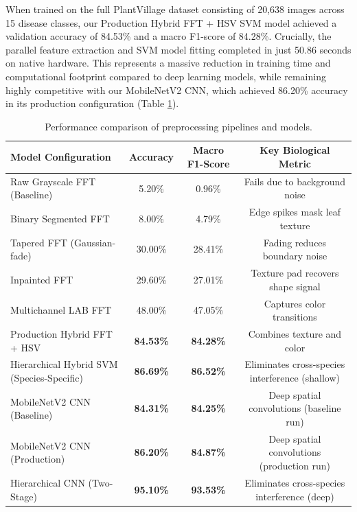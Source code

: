 \documentclass[11pt,a4paper]{article}
\begin{document}
When trained on the full PlantVillage dataset consisting of 20,638 images across 15 disease classes, our Production Hybrid FFT + HSV SVM model achieved a validation accuracy of 84.53\% and a macro F1-score of 84.28\%. Crucially, the parallel feature extraction and SVM model fitting completed in just 50.86 seconds on native hardware. This represents a massive reduction in training time and computational footprint compared to deep learning models, while remaining highly competitive with our MobileNetV2 CNN, which achieved 86.20\% accuracy in its production configuration (Table \ref{tab:comparison}).

\begin{table}[H]
\centering
\begin{tabular}{|l|c|c|c|}
\hline
\textbf{Model Configuration} & \textbf{Accuracy} & \textbf{Macro F1-Score} & \textbf{Key Biological Metric} \\ \hline
Raw Grayscale FFT (Baseline) & 5.20\% & 0.96\% & Fails due to background noise \\ \hline
Binary Segmented FFT & 8.00\% & 4.79\% & Edge spikes mask leaf texture \\ \hline
Tapered FFT (Gaussian-fade) & 30.00\% & 28.41\% & Fading reduces boundary noise \\ \hline
Inpainted FFT & 29.60\% & 27.01\% & Texture pad recovers shape signal \\ \hline
Multichannel LAB FFT & 48.00\% & 47.05\% & Captures color transitions \\ \hline
Production Hybrid FFT + HSV & \textbf{84.53\%} & \textbf{84.28\%} & Combines texture and color \\ \hline
Hierarchical Hybrid SVM (Species-Specific) & \textbf{86.69\%} & \textbf{86.52\%} & Eliminates cross-species interference (shallow) \\ \hline
MobileNetV2 CNN (Baseline) & \textbf{84.31\%} & \textbf{84.25\%} & Deep spatial convolutions (baseline run) \\ \hline
MobileNetV2 CNN (Production) & \textbf{86.20\%} & \textbf{84.87\%} & Deep spatial convolutions (production run) \\ \hline
Hierarchical CNN (Two-Stage) & \textbf{95.10\%} & \textbf{93.53\%} & Eliminates cross-species interference (deep) \\ \hline
\end{tabular}
\caption{Performance comparison of preprocessing pipelines and models.}
\label{tab:comparison}
\end{table}
\end{document}
